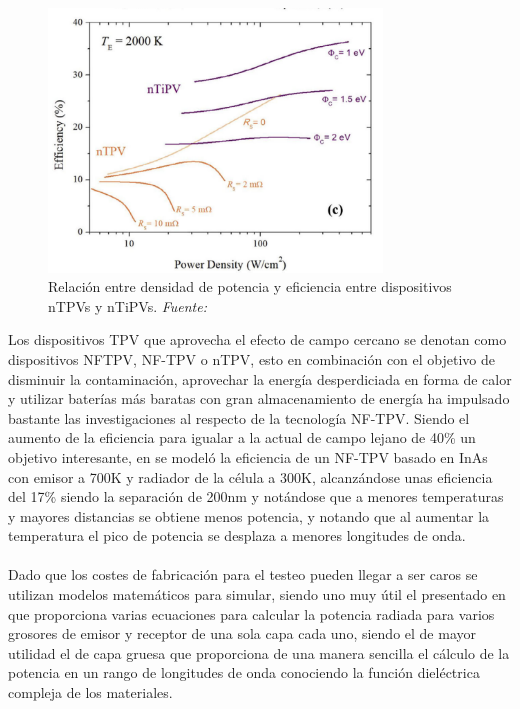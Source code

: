 \begin{figure}[H]
	\centering
		\includegraphics[height=7cm]{figuras/PowerDensityVSEfficiency_nTiPV.png}
	\caption[Relación entre densidad de potencia y eficiencia entre dispositivos nTPVs y nTiPVs]{Relación entre densidad de potencia y eficiencia entre dispositivos nTPVs y nTiPVs. \textit{Fuente: \cite{thermoionic_TPV_NF}}}
	\label{fig:PowerDensityVSEfficiency_nTiPV}
\end{figure}
Los dispositivos TPV que aprovecha el efecto de campo cercano se denotan como dispositivos NFTPV, NF-TPV o nTPV, esto en combinación con el objetivo de disminuir la contaminación, aprovechar la energía desperdiciada en forma de calor y utilizar baterías más baratas con gran almacenamiento de energía ha impulsado bastante las investigaciones al respecto de la tecnología NF-TPV. Siendo el aumento de la eficiencia para igualar a la actual de campo lejano de 40\% \cite{thermophotovoltaic_40} un objetivo interesante, en \cite{modelEfficiency_NF_TPV} se modeló la eficiencia de un NF-TPV basado en InAs con emisor a  700K y radiador de la célula a 300K, alcanzándose unas eficiencia del 17\% siendo la separación de 200nm y notándose que a menores temperaturas y mayores distancias se obtiene menos potencia, y notando que al aumentar la temperatura el pico de potencia se desplaza a menores longitudes de onda.\\\\
Dado que los costes de fabricación para el testeo pueden llegar a ser caros se utilizan modelos matemáticos para simular, siendo uno muy útil el presentado en \cite{nfTPV_equations} que proporciona varias ecuaciones para calcular la potencia radiada para varios grosores de emisor y receptor de una sola capa cada uno, siendo el de mayor utilidad el de capa gruesa que proporciona de una manera sencilla el cálculo de la potencia en un rango de longitudes de onda conociendo la función dieléctrica compleja de los materiales.\\\\
